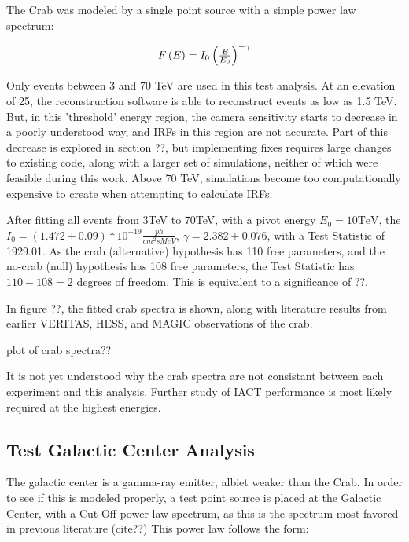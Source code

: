     The Crab was modeled by a single point source with a simple power law spectrum:

    \begin{equation} \label{eqn:powerlaw}
    $$  F\left( E \right) = I_{0} \left( \frac{E}{E_{0}} \right)^{-\gamma} $$
    \end{equation}

    Only events between 3 and 70 TeV are used in this test analysis.
    At an elevation of 25\degree, the reconstruction software is able to reconstruct events as low as 1.5 TeV.
    But, in this 'threshold' energy region, the camera sensitivity starts to decrease in a poorly understood way, and IRFs in this region are not accurate.
    Part of this decrease is explored in section ??, but implementing fixes requires large changes to existing code, along with a larger set of simulations, neither of which were feasible during this work.
    Above 70 TeV, simulations become too computationally expensive to create when attempting to calculate IRFs.
    
    After fitting all events from 3TeV to 70TeV, with a pivot energy $ E_{0}= 10\text{TeV} $, the $ I_{0} = \left(1.472\pm0.09\right)*10^{-19} \frac{ph}{cm^{2} s MeV} $, $ \gamma = 2.382 \pm 0.076 $, with a Test Statistic of 1929.01.
    As the crab (alternative) hypothesis has 110 free parameters, and the no-crab (null) hypothesis has 108 free parameters, the Test Statistic has $ 110 - 108 = 2 $ degrees of freedom.
    This is equivalent to a significance of ??.
    
    In figure ??, the fitted crab spectra is shown, along with literature results from earlier VERITAS, HESS, and MAGIC observations of the crab.
    
    plot of crab spectra??
    
    It is not yet understood why the crab spectra are not consistant between each experiment and this analysis.
    Further study of IACT performance is most likely required at the highest energies.
  
    

  \subsection{Test Galactic Center Analysis}

    The galactic center is a gamma-ray emitter, albiet weaker than the Crab.
    In order to see if this is modeled properly, a test point source is placed at the Galactic Center, with a Cut-Off power law spectrum, as this is the spectrum most favored in previous literature (cite??)
    This power law follows the form:


